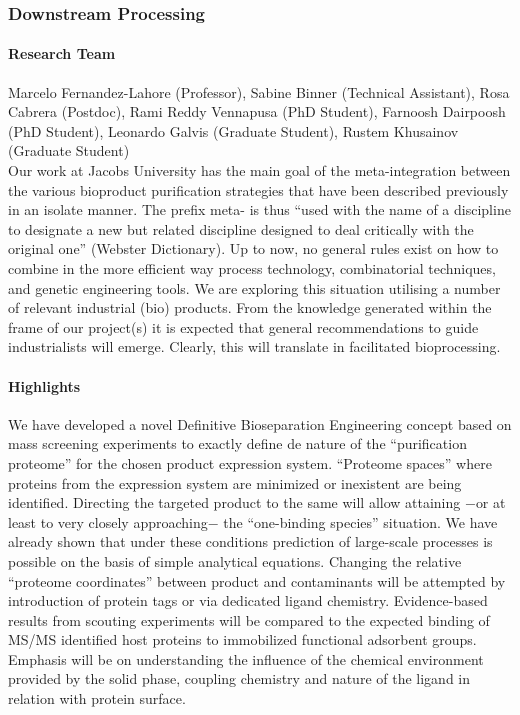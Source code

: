 \subsubsection{Downstream Processing}


\paragraph{Research Team}
%
Marcelo Fernandez-Lahore (Professor), Sabine Binner (Technical Assistant), Rosa Cabrera (Postdoc), Rami Reddy Vennapusa (PhD Student), Farnoosh Dairpoosh (PhD Student), Leonardo Galvis (Graduate Student), Rustem Khusainov (Graduate Student)\\


Our work at Jacobs University has the main goal of the meta-integration between
the various bioproduct purification strategies that have been described
 previously in an isolate manner. The prefix meta- is thus
 ``used with the name of a discipline to designate a new but
  related discipline designed to deal critically with the original one''
  (Webster Dictionary). Up to now, no general rules exist on how to
   combine in the more efficient way process technology, combinatorial
   techniques, and genetic engineering tools. We are exploring this situation
    utilising a number of relevant industrial (bio) products. From the knowledge generated within the frame of our project(s) it is expected that general recommendations to guide industrialists will emerge. Clearly, this will translate in facilitated bioprocessing.

\paragraph{Highlights}
%
We have developed a novel Definitive Bioseparation Engineering concept based on mass screening experiments to exactly define de nature of the ``purification proteome'' for the chosen product expression system. ``Proteome spaces'' where proteins from the expression system are minimized or inexistent are being identified. Directing the targeted product to the same will allow attaining $-$or at least to very closely approaching$-$ the ``one-binding species'' situation. We have already shown that under these conditions prediction of large-scale processes is possible on the basis of simple analytical equations. Changing the relative ``proteome coordinates'' between product and contaminants will be attempted by introduction of protein tags or via dedicated ligand chemistry. Evidence-based results from scouting experiments will be compared to the expected binding of MS/MS identified host proteins to immobilized functional adsorbent groups. Emphasis will be on understanding the influence of the
 chemical environment provided by the solid phase, coupling chemistry and nature of the ligand in relation with protein surface.



